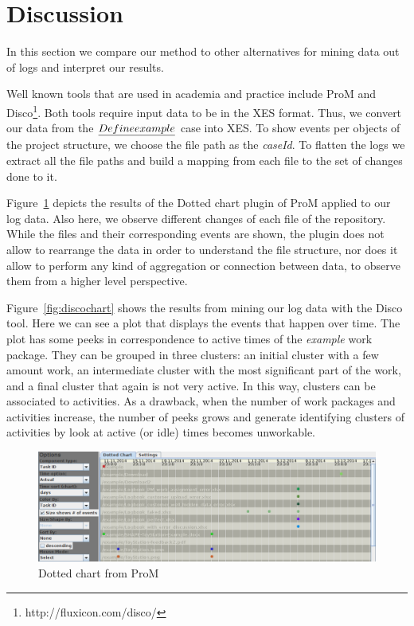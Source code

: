 \section{Discussion}\label{sec:discuss}

In this section we compare our method to other alternatives for mining data out of logs and interpret our results.

Well known tools that are used in academia and practice include ProM \cite{van2005prom} and Disco\footnote{http://fluxicon.com/disco/}. Both tools require input data to be in the XES \citep{verbeek2010xes} format. Thus, we convert our data from the $\emph{Define example}$ case into XES. To show events per objects of the project structure, we choose the file path as the \emph{caseId}. To flatten the logs we extract all the file paths and build a mapping from each file to the set of changes done to it.

Figure~\ref{fig:dottedchart} depicts the results of the Dotted chart plugin of ProM applied to our log data. Also here, we observe different changes of each file of the repository. While the files and their corresponding events are shown, the plugin does not allow to rearrange the data in order to understand the file structure, nor does it allow to perform any kind of aggregation or connection between data, to observe them from a higher level perspective.

Figure~\ref{fig:discochart} shows the results from mining our log data with the Disco tool. Here we can see a plot that displays the events that happen over time. The plot has some peeks in correspondence to active times of the \emph{example} work package. They can be grouped in three clusters: an initial cluster with a few amount work, an intermediate cluster with the most significant part of the work, and a final cluster that again is not very active. In this way, clusters can be associated to activities. As a drawback, when the number of work packages and activities increase, the number of peeks grows and generate identifying clusters of activities by look at active (or idle) times becomes unworkable.

\begin{figure}
\centering
\includegraphics[width=\textwidth]{bpm2015/imgs/dotted_chart_ordered_by_taskID_cut}
\caption{Dotted chart from ProM}
\label{fig:dottedchart}
\end{figure}


